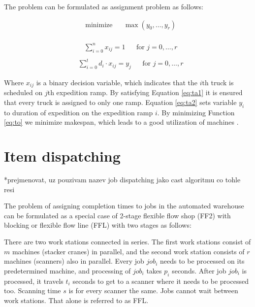 \documentclass{ctuthesis}
\begin{document}
  The problem can be formulated as assignment problem as follows:
 
 \begin{equation}\label{eq:to}
\begin{aligned}
&\text{minimize}
&&\max(y_0, \ldots, y_r)
\end{aligned}
\end{equation}
\\
\begin{equation} \label{eq:ta1}
\begin{aligned}
    & \sum_{i=0}^{n} x_{ij} = 1 && \text{for } j=0, \ldots, r\\
\end{aligned}
\end{equation}
\begin{equation} \label{eq:ta2}
\begin{aligned}
    & \sum_{i=0}^{t} {d_i} \cdot x_{ij} = y_j && \text{for } j=0, \ldots, r
\end{aligned}
\end{equation}
  
Where $x_{ij}$ is a binary decision variable, which indicates that the $i$th truck is scheduled on $j$th expedition ramp. By satisfying Equation \ref{eq:ta1} it is ensured that every truck is assigned to only one ramp. Equation \ref{eq:ta2} sets variable $y_i$ to duration of expedition on the expedition ramp $i$. By minimizing Function \ref{eq:to} we minimize makespan, which leads to a good utilization of machines \cite{pinedo}.

 
\section{Item dispatching}*prejmenovat, uz pouzivam nazev job dispatching jako cast algoritmu co tohle resi
\label{subsec:expeditiondispatching}

The problem of assigning completion times to jobs in the automated warehouse can be formulated as a special case of 2-stage flexible flow shop (FF2) with blocking or flexible flow line (FFL) with two stages as follows:

There are two work stations connected in series. The first work stations consist of $m$ machines (stacker cranes) in parallel, and the second work station consists of $r$ machines (scanners) also in parallel. Every job $job_i$ needs to be processed on its predetermined machine, and processing of $job_i$ takes $p_i$ seconds. After job $job_i$ is processed, it travels $t_i$ seconds to get to a scanner where it needs to be processed too. Scanning time $s$ is for every scanner the same. Jobs cannot wait between work stations. That alone is referred to as FFL.
\end{document}
